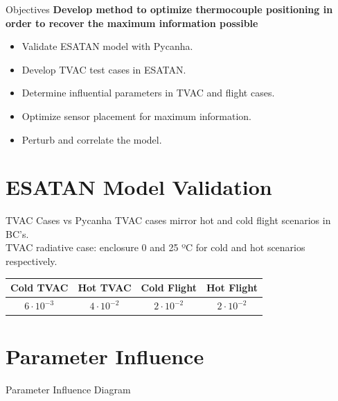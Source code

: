 \documentclass{cubeamer}
\begin{document}
\begin{frame}{Objectives}
\textbf{Develop method to optimize thermocouple positioning in order to recover the maximum information possible}
    \begin{itemize}
        \item Validate ESATAN model with Pycanha.
        \item Develop TVAC test cases in ESATAN.
        \item Determine influential parameters in TVAC and flight cases.
        \item Optimize sensor placement for maximum information.
        \item Perturb and correlate the model.
    \end{itemize}
\end{frame}


\section{ESATAN Model Validation}

\begin{frame}{TVAC Cases vs Pycanha}
TVAC cases mirror  hot and cold flight scenarios in BC's. \\
TVAC radiative case: enclosure 0 and 25 ºC for cold and hot scenarios respectively.
    \begin{center}
    \begin{tabular}{cccc}
    \toprule
    \textbf{Cold TVAC} & \textbf{Hot TVAC} & \textbf{Cold Flight} & \textbf{Hot Flight} \\
    \midrule
    $6\cdot 10^{-3}$ & $4\cdot 10^{-2}$ & $2\cdot 10^{-2}$ & $2\cdot 10^{-2}$ \\
    \bottomrule
    \end{tabular}
    \end{center}
\end{frame}

\section{Parameter Influence}

\begin{frame}{Parameter Influence Diagram}
    \begin{center}
    
    \end{center}
\end{frame}
\end{document}
